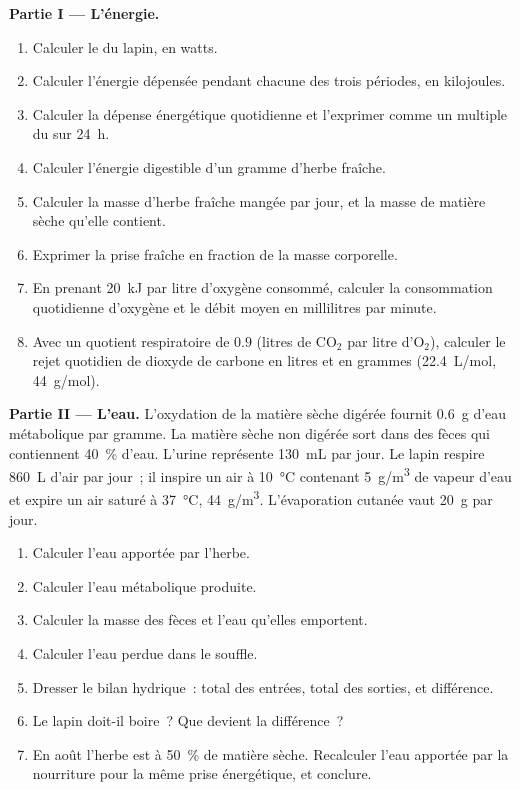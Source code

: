 \begin{problem}
\medskip
\noindent\textbf{Partie I --- L'énergie.}
\begin{enumerate}
  \item Calculer le  du lapin, en watts.
  \item Calculer l'énergie dépensée pendant chacune des trois périodes,
        en kilojoules.
  \item Calculer la dépense énergétique quotidienne et l'exprimer comme
        un multiple du  sur \qty{24}{h}.
  \item Calculer l'énergie digestible d'un gramme d'herbe fraîche.
  \item Calculer la masse d'herbe fraîche mangée par jour, et la masse
        de matière sèche qu'elle contient.
  \item Exprimer la prise fraîche en fraction de la masse corporelle.
  \item En prenant \qty{20}{kJ} par litre d'oxygène consommé, calculer
        la consommation quotidienne d'oxygène et le débit moyen en
        millilitres par minute.
  \item Avec un quotient respiratoire de $0.9$ (litres de
        $\mathrm{CO_2}$ par litre d'$\mathrm{O_2}$), calculer le rejet
        quotidien de dioxyde de carbone en litres et en grammes
        (\qty{22.4}{L/mol}, \qty{44}{g/mol}).
\end{enumerate}

\medskip
\noindent\textbf{Partie II --- L'eau.}
L'oxydation de la matière sèche digérée fournit \qty{0.6}{g} d'eau
métabolique par gramme. La matière sèche non digérée sort dans des
fèces qui contiennent \qty{40}{\%} d'eau. L'urine représente
\qty{130}{mL} par jour. Le lapin respire \qty{860}{L} d'air par jour~;
il inspire un air à \qty{10}{\celsius} contenant \qty{5}{g/m^3} de
vapeur d'eau et expire un air saturé à \qty{37}{\celsius},
\qty{44}{g/m^3}. L'évaporation cutanée vaut \qty{20}{g} par jour.
\begin{enumerate}[resume]
  \item Calculer l'eau apportée par l'herbe.
  \item Calculer l'eau métabolique produite.
  \item Calculer la masse des fèces et l'eau qu'elles emportent.
  \item Calculer l'eau perdue dans le souffle.
  \item Dresser le bilan hydrique~: total des entrées, total des
        sorties, et différence.
  \item Le lapin doit-il boire~? Que devient la différence~?
  \item En août l'herbe est à \qty{50}{\%} de matière sèche. Recalculer
        l'eau apportée par la nourriture pour la même prise
        énergétique, et conclure.
\end{enumerate}


\end{problem}

